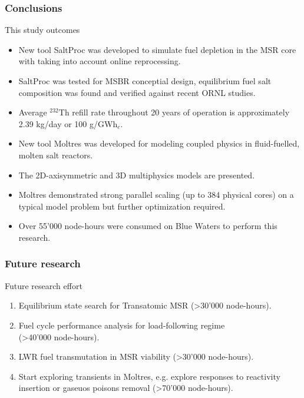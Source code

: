 \begin{frame}
  \frametitle{Conclusions}
        \begin{block}{This study outcomes}
        \begin{itemize}
                \item New tool SaltProc was developed to simulate fuel depletion in the \gls{MSR} core with taking into account online reprocessing.
                \item SaltProc was tested for \gls{MSBR} conceptial design, equilibrium fuel salt composition was found and verified against recent \gls{ORNL} studies.
		\item Average $^{232}$Th refill rate throughout 20 years of operation is approximately 2.39 kg/day or 100 g/GWh$_e$.
		\vspace*{0.15in}
		\item New tool Moltres was developed for modeling coupled physics in fluid-fuelled, molten salt reactors.
		\item The 2D-axisymmetric and 3D multiphysics models are presented.
		\item Moltres demonstrated strong parallel scaling (up to 384 physical cores) on a typical model problem but further optimization required.
		\item Over 55'000 node-hours were consumed on Blue Waters to perform this research.
        \end{itemize}
        \end{block}
        
\end{frame}

\begin{frame}
  \frametitle{Future research}
         
              \begin{block}{Future research effort}
                 \begin{enumerate}
                \item Equilibrium state search for Transatomic \gls{MSR} (\textgreater 30'000 node-hours).
                \item Fuel cycle performance analysis for load-following regime \\ (\textgreater 40'000 node-hours).
                \item \gls{LWR} fuel transmutation in \gls{MSR} viability (\textgreater 30'000 node-hours).
		\vspace*{0.15in}
                \item Start exploring transients in Moltres, e.g. explore responses to reactivity insertion or gaseuos poisons removal (\textgreater 70'000 node-hours).
               \end{enumerate}
               \end{block}
\end{frame}
